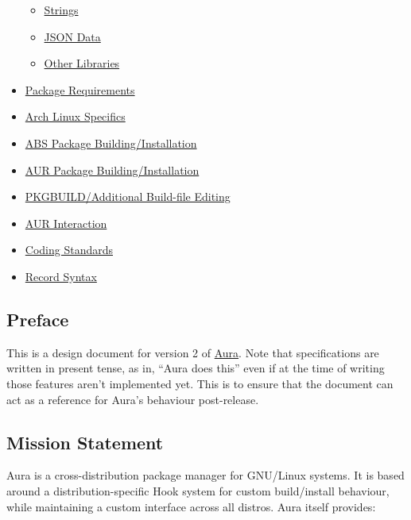 \documentclass{article}
\begin{document}
\begin{itemize}
  \begin{itemize}
  \itemsep1pt\parskip0pt
  \item
    \href{/DESIGN.md\#strings}{Strings}
  \item
    \href{/DESIGN.md\#json-data}{JSON Data}
  \item
    \href{/DESIGN.md\#other-libraries}{Other Libraries}
  \end{itemize}
\item
  \href{/DESIGN.md\#package-requirements}{Package Requirements}
\item
  \href{/DESIGN.md\#arch-linux-specifics}{Arch Linux Specifics}
\item
  \href{/DESIGN.md\#abs-package-buildinginstallation}{ABS Package
  Building/Installation}
\item
  \href{/DESIGN.md\#aur-package-buildinginstallation}{AUR Package
  Building/Installation}
\item
  \href{/DESIGN.md\#pkgbuildadditional-build-file-editing}{PKGBUILD/Additional
  Build-file Editing}
\item
  \href{/DESIGN.md\#aur-interaction}{AUR Interaction}
\item
  \href{/DESIGN.md\#coding-standards}{Coding Standards}
\item
  \href{/DESIGN.md\#record-syntax}{Record Syntax}
\end{itemize}

\subsection{Preface}\label{preface}

This is a design document for version 2 of
\href{https://github.com/fosskers/aura}{Aura}. Note that specifications
are written in present tense, as in, ``Aura does this'' even if at the
time of writing those features aren't implemented yet. This is to ensure
that the document can act as a reference for Aura's behaviour
post-release.

\subsection{Mission Statement}\label{mission-statement}

Aura is a cross-distribution package manager for GNU/Linux systems. It
is based around a distribution-specific Hook system for custom
build/install behaviour, while maintaining a custom interface across all
distros. Aura itself provides:
\end{document}
